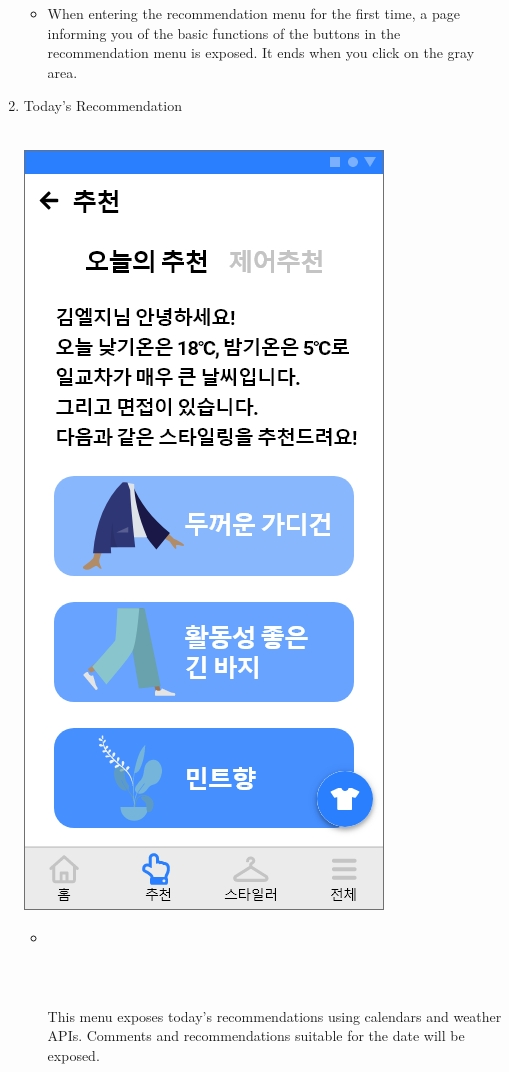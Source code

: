 \documentclass[conference]{IEEEtran}
\begin{document}
\begin{enumerate}
        \begin{itemize}
    \item[] When entering the recommendation menu for the first time, a page informing you of the basic functions of the buttons in the recommendation menu is exposed. It ends when you click on the gray area. \\
\end{itemize}
     \item Today's Recommendation \\ \\
     \centerline{\includegraphics[scale=0.32]{추천2.jpg}}
    \begin{itemize}
    \item[] \\ \\ \\ \\ This menu exposes today's recommendations using calendars and weather APIs. Comments and recommendations suitable for the date will be exposed.\\

\end{itemize}
\end{enumerate}
\end{document}

